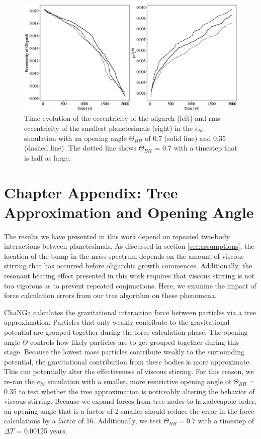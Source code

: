 \begin{figure}
    \includegraphics[width=\textwidth]{figures/plSS/theta_test.eps}
    \caption{Time evolution of the eccentricity of the oligarch (left) and rms eccentricity of the smallest planetesimals (right) in the 
    $e_{hi}$ simulation with an opening angle $\Theta_{BH}$ of 0.7 (solid line) and 0.35 (dashed line). The dotted line shows 
    $\Theta_{BH}$ = 0.7 with a timestep that is half as large.}
    \label{fig:theta_test}
\end{figure}

\section{Chapter Appendix: Tree Approximation and Opening Angle}\label{sec:openAngle}

The results we have presented in this work depend on repeated two-body interactions between planetesimals. As discussed in 
section \ref{sec:assumptions}, the location of the bump in the mass spectrum depends on the amount of viscous stirring that 
has occurred before oligarchic growth commences. Additionally, the resonant heating effect presented in this work requires that 
viscous stirring is not too vigorous as to prevent repeated conjunctions. Here, we examine the impact of force calculation errors 
from our tree algorithm on these phenomena.

{\sc ChaNGa} calculates the gravitational interaction force between particles via a tree approximation. Particles that only weakly 
contribute to the gravitational potential are grouped together during the force calculation phase. The opening angle $\Theta$ 
controls how likely particles are to get grouped together during this stage. Because the lowest mass particles contribute weakly 
to the surrounding potential, the gravitational contribution from these bodies is more approximate. This can potentially alter the 
effectiveness of viscous stirring. For this reason, we re-ran the $e_{hi}$ simulation with a smaller, more restrictive opening 
angle of $\Theta_{BH}$ = 0.35 to test whether the tree approximation is noticeably altering the behavior of viscous stirring. 
Because we expand forces from tree nodes to hexadecapole order, an opening angle that is a factor of 2 smaller should reduce 
the error in the force calculations by a factor of 16. Additionally, we test $\Theta_{BH} = 0.7$ with a timestep of $\Delta T$ = 
0.00125 years.

